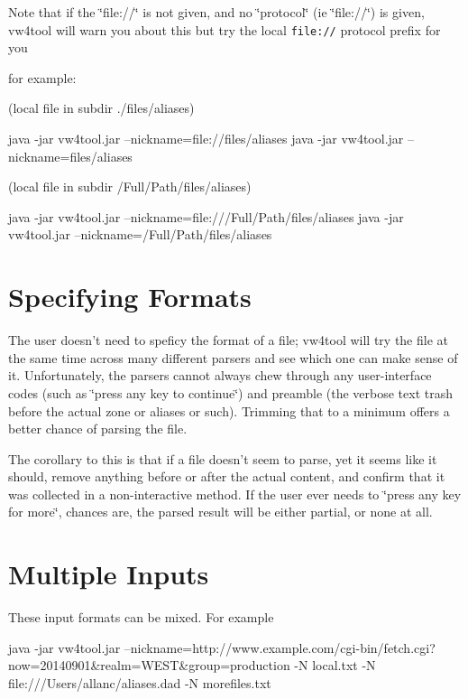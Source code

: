 Note that if the \char`\"{}file\+://\char`\"{} is not given, and no \char`\"{}protocol\char`\"{} (ie \char`\"{}file\+://\char`\"{}) is given, vw4tool will warn you about this but try the local {\tt file\+://} protocol prefix for you

for example\+:

(local file in subdir ./files/aliases) \begin{DoxyVerb}java -jar vw4tool.jar --nickname=file://files/aliases
java -jar vw4tool.jar --nickname=files/aliases
\end{DoxyVerb}


(local file in subdir /\+Full/\+Path/files/aliases) \begin{DoxyVerb}java -jar vw4tool.jar --nickname=file:///Full/Path/files/aliases
java -jar vw4tool.jar --nickname=/Full/Path/files/aliases
\end{DoxyVerb}


\section*{Specifying Formats }

The user doesn't need to speficy the format of a file; vw4tool will try the file at the same time across many different parsers and see which one can make sense of it. Unfortunately, the parsers cannot always chew through any user-\/interface codes (such as \char`\"{}press any key to continue\char`\"{}) and preamble (the verbose text trash before the actual zone or aliases or such). Trimming that to a minimum offers a better chance of parsing the file.

The corollary to this is that if a file doesn't seem to parse, yet it seems like it should, remove anything before or after the actual content, and confirm that it was collected in a non-\/interactive method. If the user ever needs to \char`\"{}press any key for more\char`\"{}, chances are, the parsed result will be either partial, or none at all.

\section*{Multiple Inputs }

These input formats can be mixed. For example \begin{DoxyVerb}java -jar vw4tool.jar --nickname=http://www.example.com/cgi-bin/fetch.cgi?now=20140901&realm=WEST&group=production -N local.txt -N file:///Users/allanc/aliases.dad -N morefiles.txt
\end{DoxyVerb}


